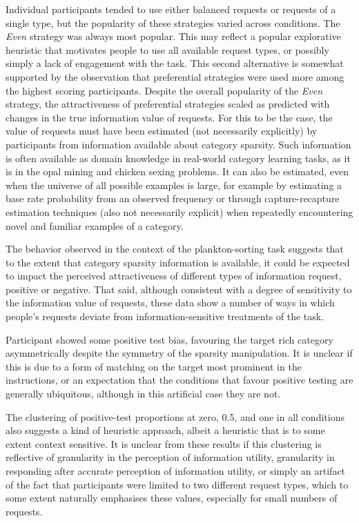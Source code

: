 \documentclass[10pt,letterpaper]{article}
\begin{document}
Individual participants tended to use either balanced requests or requests of a single type, but the popularity of these strategies varied across conditions. The \textit{Even} strategy was always most popular. This may reflect a popular explorative heuristic that motivates people to use all available request types, or possibly simply a lack of engagement with the task. This second alternative is somewhat supported by the observation that preferential strategies were used more among the highest scoring participants. Despite the overall popularity of the \textit{Even} strategy, the attractiveness of preferential strategies scaled as predicted with changes in the true information value of requests. For this to be the case, the value of requests must have been estimated (not necessarily explicitly) by participants from information available about category sparsity. Such information is often available as domain knowledge in real-world category learning tasks, as it is in the opal mining and chicken sexing problems. It can also be estimated, even when the universe of all possible examples is large, for example by estimating a base rate probability from an observed frequency or through capture-recapture estimation techniques (also not necessarily explicit) when repeatedly encountering novel and familiar examples of a category. %

The behavior observed in the context of the plankton-sorting task suggests that to the extent that category sparsity information is available, it could be expected to impact the perceived attractiveness of different types of information request, positive or negative. That said, although consistent with a degree of sensitivity to the information value of requests, these data show a number of ways in which people's requests deviate from information-sensitive treatments of the task.

Participant showed some positive test bias, favouring the target rich category asymmetrically despite the symmetry of the sparsity manipulation. It is unclear if this is due to a form of matching \cite{evans1998matching} on the target most prominent in the instructions, or an expectation that the conditions that favour positive testing are generally ubiquitous, although in this artificial case they are not.

The clustering of positive-test proportions at zero, 0.5, and one in all conditions also suggests a kind of heuristic approach, albeit a heuristic that is to some extent context sensitive. It is unclear from these results if this clustering is reflective of granularity in the perception of information utility, granularity in responding after accurate perception of information utility, or simply an artifact of the fact that participants were limited to two different request types, which to some extent naturally emphasises these values, especially for small numbers of requests.
\end{document}
